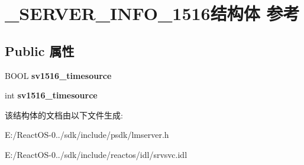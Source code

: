 \hypertarget{struct___s_e_r_v_e_r___i_n_f_o__1516}{}\section{\+\_\+\+S\+E\+R\+V\+E\+R\+\_\+\+I\+N\+F\+O\+\_\+1516结构体 参考}
\label{struct___s_e_r_v_e_r___i_n_f_o__1516}
\subsection*{Public 属性}
\begin{DoxyCompactItemize}
\item 
\mbox{\label{struct___s_e_r_v_e_r___i_n_f_o__1516_ae16d1e7ba1e407dd50e2581138d37274}} 
B\+O\+OL {\bfseries sv1516\+\_\+timesource}
\item 
\mbox{\label{struct___s_e_r_v_e_r___i_n_f_o__1516_a207acc54e500d38cf0ff55e550e5a320}} 
int {\bfseries sv1516\+\_\+timesource}
\end{DoxyCompactItemize}


该结构体的文档由以下文件生成\+:\begin{DoxyCompactItemize}
\item 
E\+:/\+React\+O\+S-\/0../sdk/include/psdk/lmserver.\+h\item 
E\+:/\+React\+O\+S-\/0../sdk/include/reactos/idl/srvsvc.\+idl\end{DoxyCompactItemize}
